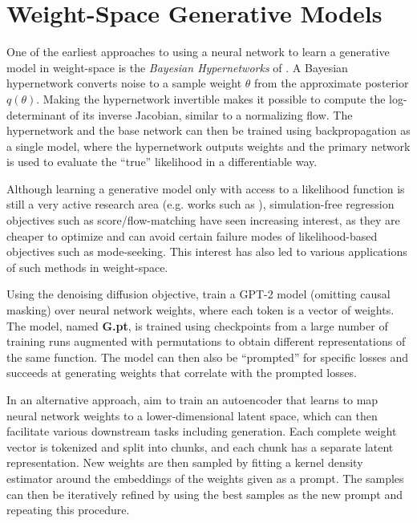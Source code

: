 \section{Weight-Space Generative Models}

One of the earliest approaches to using a neural network to learn a generative model in weight-space is the \textit{Bayesian Hypernetworks} of \citet{kruegerBayesianHypernetworks2018}. A Bayesian hypernetwork converts noise to a sample weight $\theta$ from the approximate posterior $q(\theta)$. Making the hypernetwork invertible makes it possible to compute the log-determinant of its inverse Jacobian, similar to a normalizing flow. The hypernetwork and the base network can then be trained using backpropagation as a single model, where the hypernetwork outputs weights and the primary network is used to evaluate the ``true'' likelihood in a differentiable way. 

Although learning a generative model only with access to a likelihood function is still a very active research area (e.g. works such as \citep{tongImprovingGeneralizingFlowbased2023}), simulation-free regression objectives such as score/flow-matching have seen increasing interest, as they are cheaper to optimize and can avoid certain failure modes of likelihood-based objectives such as mode-seeking. This interest has also led to various applications of such methods in weight-space.

Using the denoising diffusion objective, \citet{peeblesLearningLearnGenerative2022} train a GPT-2 model \citep{radfordLanguageModelsAre2019} (omitting causal masking) over neural network weights, where each token is a vector of weights. The model, named \textbf{G.pt}, is trained using checkpoints from a large number of training runs augmented with permutations to obtain different representations of the same function. The model can then also be ``prompted'' for specific losses and succeeds at generating weights that correlate with the prompted losses. 

In an alternative approach, \citet{schurholtScalableVersatileWeight2024} aim to train an autoencoder that learns to map neural network weights to a lower-dimensional latent space, which can then facilitate various downstream tasks including generation. Each complete weight vector is tokenized and split into chunks, and each chunk has a separate latent representation. New weights are then sampled by fitting a kernel density estimator around the embeddings of the weights given as a prompt. The samples can then be iteratively refined by using the best samples as the new prompt and repeating this procedure. 


